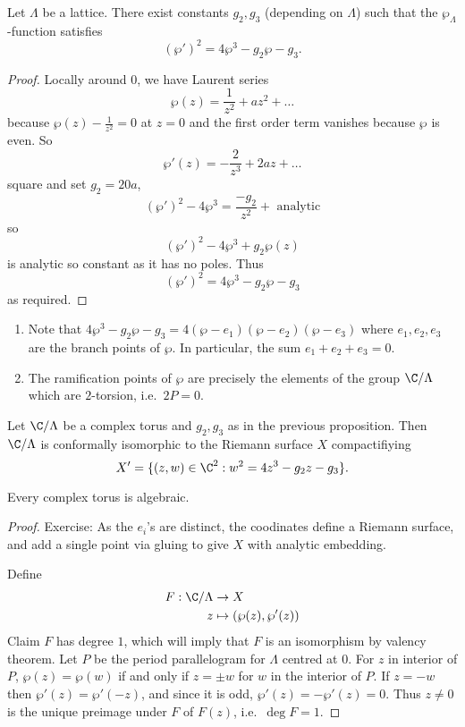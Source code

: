\documentclass[a4paper]{article}
\begin{document}
\begin{proposition}
  Let \(\Lambda\) be a lattice. There exist constants \(g_2, g_3\) (depending on \(\Lambda\)) such that the \(\wp_\Lambda\)-function satisfies
  \[
    (\wp')^2 = 4 \wp^3 - g_2 \wp - g_3.
  \]
\end{proposition}

\begin{proof}
  Locally around \(0\), we have Laurent series
  \[
    \wp(z) = \frac{1}{z^2} + az^2 + \dots
  \]
  because \(\wp(z) - \frac{1}{z^2} = 0\) at \(z = 0\) and the first order term vanishes because \(\wp\) is even. So
  \[
    \wp'(z) = - \frac{2}{z^3} + 2az + \dots
  \]
  square and set \(g_2 = 20a\),
  \[
    (\wp')^2 - 4\wp^3 = \frac{-g_2}{z^2} + \text{ analytic}
  \]
  so
  \[
    (\wp')^2 - 4\wp^3 + g_2 \wp(z)
  \]
  is analytic so constant as it has no poles. Thus
  \[
    (\wp')^2 = 4\wp^3 - g_2 \wp - g_3
  \]
  as required.
\end{proof}

\begin{note}\leavevmode
  \begin{enumerate}
  \item Note that \(4\wp^3 - g_2 \wp - g_3 = 4 (\wp - e_1) (\wp - e_2) (\wp - e_3)\) where \(e_1, e_2, e_3\) are the branch points of \(\wp\). In particular, the sum \(e_1 + e_2 + e_3 = 0\).
  \item The ramification points of \(\wp\) are precisely the elements of the group \(\C/\Lambda\) which are \(2\)-torsion, i.e.\ \(2P = 0\).
  \end{enumerate}
\end{note}

\begin{corollary}
  Let \(\C / \Lambda\) be a complex torus and \(g_2, g_3\) as in the previous proposition. Then \(\C / \Lambda\) is conformally isomorphic to the Riemann surface \(X\) compactifiying
  \[
    X' = \{(z, w) \in \C^2: w^2 = 4z^3 - g_2z - g_3\}.
  \]
\end{corollary}

Every complex torus is algebraic.

\begin{proof}
  Exercise: As the \(e_i\)'s are distinct, the coodinates define a Riemann surface, and add a single point via gluing to give \(X\) with analytic embedding.

  Define
  \begin{align*}
    F: \C / \Lambda &\to X \\
    z &\mapsto (\wp(z), \wp'(z))
  \end{align*}
  Claim \(F\) has degree \(1\), which will imply that \(F\) is an isomorphism by valency theorem. Let \(P\) be the period parallelogram for \(\Lambda\) centred at \(0\). For \(z\) in interior of \(P\), \(\wp(z) = \wp(w)\) if and only if \(z = \pm w\) for \(w\) in the interior of \(P\). If \(z = -w\) then \(\wp'(z) = \wp'(-z)\), and since it is odd, \(\wp'(z) = -\wp'(z) = 0\). Thus \(z \neq 0\) is the unique preimage under \(F\) of \(F(z)\), i.e.\ \(\deg F = 1\). %
\end{proof}
\end{document}
